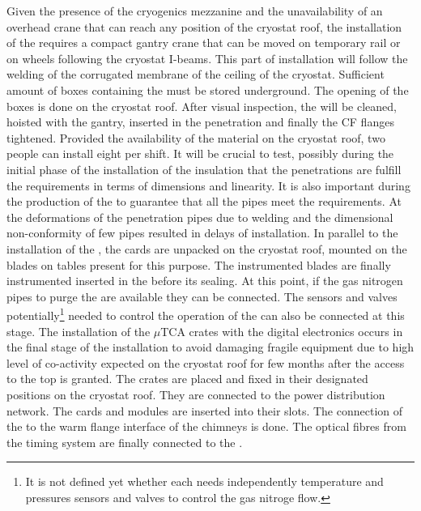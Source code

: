 Given the presence of the cryogenics mezzanine and the unavailability of an overhead crane that can reach any position of the cryostat roof, the installation of the  requires a compact gantry crane that can be moved on temporary rail or on wheels following the cryostat I-beams.
This part of installation will follow the welding of the corrugated membrane of the ceiling of the cryostat.
Sufficient amount of boxes containing the  must be stored underground.
The opening of the boxes is done on the cryostat roof.
After visual inspection, the  will be cleaned, hoisted with the gantry, inserted in the penetration and finally the CF flanges tightened.
Provided the availability of the material on the cryostat roof, two people can install eight  per shift. 
It will be crucial to test, possibly during the initial phase of the installation of the insulation that the penetrations are fulfill the requirements in terms of dimensions and linearity.
It is also important during the production of the  to guarantee that all the pipes meet the requirements.
At  the deformations of the penetration pipes due to welding and the dimensional non-conformity of few  pipes resulted in delays of installation.
In parallel to the installation of the , the  cards are unpacked on the cryostat roof, mounted on the blades on tables present for this purpose.
The instrumented blades are finally instrumented inserted in the  before its sealing.
At this point, if the gas nitrogen pipes to purge the  are available they can be connected.
The sensors and  valves potentially\footnote{It is not defined yet whether each  needs independently temperature and pressures sensors and valves to control the gas nitroge flow.} needed to control the operation of the  can also be connected at this stage.
The installation of the $\mu$TCA crates with the digital electronics occurs in the final stage of the  installation to avoid damaging fragile equipment due to high level of co-activity expected on the cryostat roof for few months after the access to the top is granted.
The crates are placed and fixed in their designated positions on the cryostat roof.
They are connected to the power distribution network.
The  cards and  modules are inserted into their slots.
The connection of the   to the warm flange interface of the  chimneys is done.
The optical fibres from the timing system are finally connected to the .

